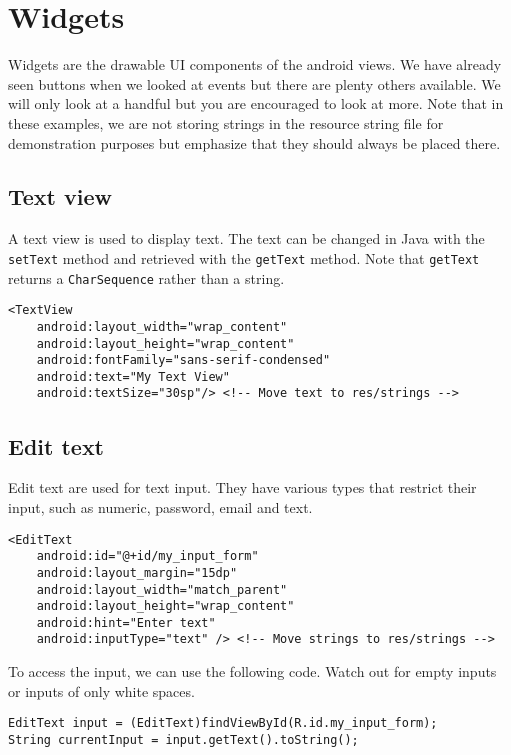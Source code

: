 \section{Widgets}
Widgets are the drawable UI components of the android views. We have already seen buttons when we looked at events but there are plenty others available. We will only look at a handful but you are encouraged to look at more. Note that in these examples, we are not storing strings in the resource string file for demonstration purposes but emphasize that they should always be placed there.

\subsection{Text view}
A text view is used to display text. The text can be changed in Java with the \texttt{setText} method and retrieved with the \texttt{getText} method. Note that \texttt{getText} returns a \texttt{CharSequence} rather than a string.
\begin{lstlisting}[style=A_XML, caption={Text view declaration}, label = {listing:dectext}]
<TextView
    android:layout_width="wrap_content"
    android:layout_height="wrap_content"
    android:fontFamily="sans-serif-condensed"
    android:text="My Text View"
    android:textSize="30sp"/> <!-- Move text to res/strings -->
\end{lstlisting}

\subsection{Edit text}
Edit text are used for text input. They have various types that restrict their input, such as numeric, password, email and text. 
\begin{lstlisting}[style=A_XML, caption={Edit text declaration}, label = {listing:edittext}]
<EditText
    android:id="@+id/my_input_form"
    android:layout_margin="15dp"
    android:layout_width="match_parent"
    android:layout_height="wrap_content"
    android:hint="Enter text"
    android:inputType="text" /> <!-- Move strings to res/strings -->
\end{lstlisting}
To access the input, we can use the following code. Watch out for empty inputs or inputs of only white spaces.
\begin{lstlisting}[style=A_Java]
EditText input = (EditText)findViewById(R.id.my_input_form);
String currentInput = input.getText().toString();
\end{lstlisting}

